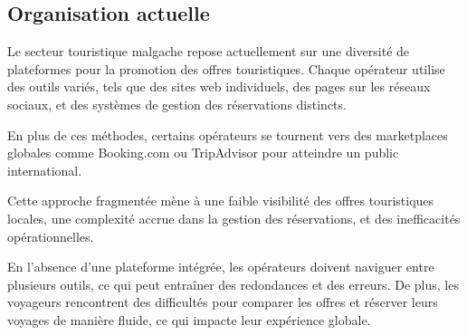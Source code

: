 \documentclass[12pt]{report}
\begin{document}
				\subsection{Organisation actuelle}
				
				\hspace{15pt} Le secteur touristique malgache repose actuellement sur une diversité de plateformes pour la promotion des offres touristiques. Chaque opérateur utilise des outils variés, tels que des sites web individuels, des pages sur les réseaux sociaux, et des systèmes de gestion des réservations distincts. 

				En plus de ces méthodes, certains opérateurs se tournent vers des marketplaces globales comme Booking.com ou TripAdvisor pour atteindre un public international.

				 Cette approche fragmentée mène à une faible visibilité des offres touristiques locales, une complexité accrue dans la gestion des réservations, et des inefficacités opérationnelles.

				En l'absence d'une plateforme intégrée, les opérateurs doivent naviguer entre plusieurs outils, ce qui peut entraîner des redondances et des erreurs. De plus, les voyageurs rencontrent des difficultés pour comparer les offres et réserver leurs voyages de manière fluide, ce qui impacte leur expérience globale.
\end{document}
